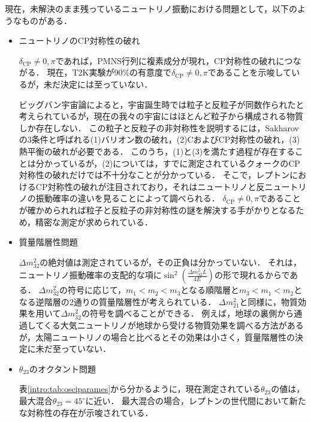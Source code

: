 \documentclass[../../main.tex]{subfiles}
\begin{document}
現在，未解決のまま残っているニュートリノ振動における問題として，以下のようなものがある．
\begin{itemize}
  \item ニュートリノのCP対称性の破れ
  
  $\delta_{\mathrm{CP}}\neq0,\pi$であれば，PMNS行列に複素成分が現れ，CP対称性の破れにつながる．
  現在，T2K実験が90\%の有意度で$\delta_{\mathrm{CP}}\neq0,\pi$であることを示唆している\cite{intro:t2k2023}が，未だ決定には至っていない．
  
  ビッグバン宇宙論によると，宇宙誕生時では粒子と反粒子が同数作られたと考えられているが，現在の我々の宇宙にはほとんど粒子から構成される物質しか存在しない．
  この粒子と反粒子の非対称性を説明するには，Sakharovの3条件と呼ばれる(1)バリオン数の破れ，(2)CおよびCP対称性の破れ，(3)熱平衡の破れが必要である\cite{intro:sakhanov}．
  このうち，(1)と(3)を満たす過程が存在することは分かっているが，(2)については，すでに測定されているクォークのCP対称性の破れだけでは不十分なことが分かっている．
  そこで，レプトンにおけるCP対称性の破れが注目されており，それはニュートリノと反ニュートリノの振動確率の違いを見ることによって調べられる．
  $\delta_{\mathrm{CP}}\neq0,\pi$であることが確かめられれば粒子と反粒子の非対称性の謎を解決する手がかりとなるため，精密な測定が求められている．
  
  \item 質量階層性問題
  
  $\Delta m^2_{32}$の絶対値は測定されているが，その正負は分かっていない．
  それは，ニュートリノ振動確率の支配的な項に$\sin^2\left(\frac{\Delta m^2_{32}L}{4E}\right)$の形で現れるからである．
  $\Delta m^2_{32}$の符号に応じて，$m_1<m_2<m_3$となる順階層と$m_3<m_1<m_2$となる逆階層の2通りの質量階層性が考えられている．
  $\Delta m^2_{21}$と同様に，物質効果を用いて$\Delta m^2_{32}$の符号を調べることができる．
  例えば，地球の裏側から通過してくる大気ニュートリノが地球から受ける物質効果を調べる方法があるが，太陽ニュートリノの場合と比べるとその効果は小さく，質量階層性の決定に未だ至っていない．
  
  \item $\theta_{23}$のオクタント問題
  
  表\ref{intro:tab:osciparames}から分かるように，現在測定されている$\theta_{23}$の値は，最大混合$\theta_{23}=45^{\circ}$に近い．
  最大混合の場合，レプトンの世代間において新たな対称性の存在が示唆されている\cite{intro:octant}．
  
\end{itemize}
\end{document}
